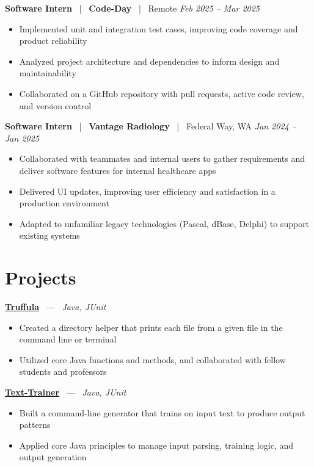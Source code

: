 \documentclass[10pt, letterpaper]{article}
\newcommand{\jobhead}[4]{%
  \vspace{5pt}%
  {\bfseries\color{dark}#1}%
  ~{\color{light}|}~%
  {\bfseries\color{navy}#2}%
  ~{\color{light}|}~%
  {\color{light}#3}%
  \hfill{\color{light}\small\textit{#4}}\\[-2pt]%
}
\newcommand{\projhead}[3]{%
  \vspace{5pt}%
  {\bfseries\color{dark}\href{#2}{#1}}%
  ~{\color{light}---}~%
  {\color{light}\small\textit{#3}}\\[-2pt]%
}
\begin{document}
\jobhead{Software Intern}{Code-Day}{Remote}{Feb 2025 – Mar 2025}
\begin{itemize}
  \item Implemented unit and integration test cases, improving code coverage and product reliability
  \item Analyzed project architecture and dependencies to inform design and maintainability
  \item Collaborated on a GitHub repository with pull requests, active code review, and version control
\end{itemize}

\jobhead{Software Intern}{Vantage Radiology}{Federal Way, WA}{Jan 2024 – Jan 2025}
\begin{itemize}
  \item Collaborated with teammates and internal users to gather requirements and deliver software features for internal healthcare apps
  \item Delivered UI updates, improving user efficiency and satisfaction in a production environment
  \item Adapted to unfamiliar legacy technologies (Pascal, dBase, Delphi) to support existing systems
\end{itemize}

\section{Projects}

\projhead{Truffula}{https://github.com/timmyd4/truffula}{Java, JUnit}
\begin{itemize}
  \item Created a directory helper that prints each file from a given file in the command line or terminal
  \item Utilized core Java functions and methods, and collaborated with fellow students and professors
\end{itemize}

\projhead{Text-Trainer}{https://github.com/timmyd4/ramblebot}{Java, JUnit}
\begin{itemize}
  \item Built a command-line generator that trains on input text to produce output patterns
  \item Applied core Java principles to manage input parsing, training logic, and output generation
\end{itemize}
\end{document}
